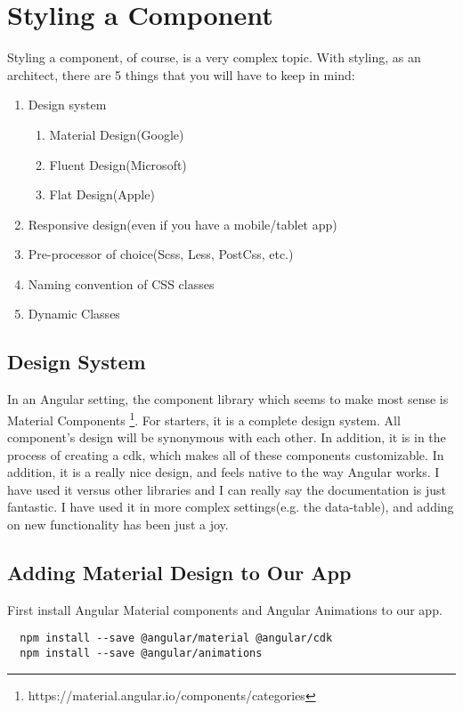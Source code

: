 \maketitle{}
\section{ Styling a Component }

Styling a component, of course, is a very complex topic. With styling, as an
architect, there are 5 things that you will have to keep in mind:
\begin{enumerate}
  \item Design system
    \begin{enumerate}
      \item Material Design(Google)
      \item Fluent Design(Microsoft)
      \item Flat Design(Apple)
    \end{enumerate}
  \item Responsive design(even if you have a mobile/tablet app)
  \item Pre-processor of choice(Scss, Less, PostCss, etc.)
  \item Naming convention of CSS classes
  \item Dynamic Classes
\end{enumerate}

\subsection{ Design System }
In an Angular setting, the component library which seems to make most sense is
Material Components
\footnote{https://material.angular.io/components/categories}. For starters, it
is a complete design system. All component's design will be synonymous with
each other. In addition, it is in the process of creating a cdk, which makes
all of these components customizable. In addition, it is a really nice design,
and feels native to the way Angular works. I have used it versus other libraries
and I can really say the documentation is just fantastic. I have used it in more
complex settings(e.g. the data-table), and adding on new functionality has been
just a joy.

\subsection{ Adding Material Design to Our App }
First install Angular Material components and Angular Animations to our app.
\begin{verbatim}
  npm install --save @angular/material @angular/cdk
  npm install --save @angular/animations
\end{verbatim}

